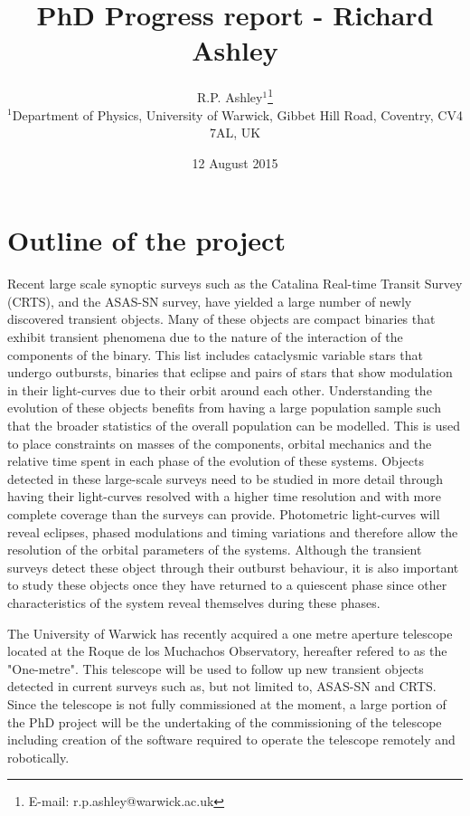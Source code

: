 \documentclass[a4paper,fleqn,usenatbib]{mnras}
\title[Richard Ashley - PhD project]{PhD Progress report - Richard Ashley}
\author[R.P. Ashley et al.]{
R.P. Ashley$^{1}$\thanks{E-mail: r.p.ashley@warwick.ac.uk}\\
$^{1}$Department of Physics, University of Warwick, Gibbet Hill Road, Coventry, CV4 7AL, UK\\
}
\date{12 August 2015}
\begin{document}
\label{firstpage}
\pagerange{\pageref{firstpage}--\pageref{lastpage}}
\maketitle




\section{Outline of the project}
Recent large scale synoptic surveys such as the Catalina Real-time Transit Survey (CRTS), \citep{Drake2009} and the ASAS-SN survey, \citep{ASASSN2014} have yielded a large number of newly discovered transient objects. Many of these objects are compact binaries that exhibit transient phenomena due to the nature of the interaction of the components of the binary. This list includes cataclysmic variable stars that undergo outbursts, binaries that eclipse and pairs of stars that show modulation in their light-curves due to their orbit around each other. Understanding the evolution of these objects benefits from having a large population sample such that the broader statistics of the overall population can be modelled. This is used to place constraints on masses of the components, orbital mechanics and the relative time spent in each phase of the evolution of these systems. Objects detected in these large-scale surveys need to be studied in more detail through having their light-curves resolved with a higher time resolution and with more complete coverage than the surveys can provide. Photometric light-curves will reveal eclipses, phased modulations and timing variations and therefore allow the resolution of the orbital parameters of the systems. Although the transient surveys detect these object through their outburst behaviour, it is also important to study these objects once they have returned to a quiescent phase since other characteristics of the system reveal themselves during these phases. 

The University of Warwick has recently acquired a one metre aperture telescope located at the Roque de los Muchachos Observatory, hereafter refered to as the "One-metre". This telescope will be used to follow up new transient objects detected in current surveys such as, but not limited to, ASAS-SN and CRTS. Since the telescope is not fully commissioned at the moment, a large portion of the PhD project will be the undertaking of the commissioning of the telescope including creation of the software required to operate the telescope remotely and robotically. 
\end{document}
